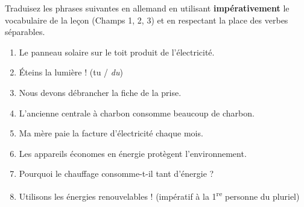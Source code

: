 \documentclass[11pt]{article}
\begin{document}
\begin{exercice}
Traduisez les phrases suivantes en allemand en utilisant \textbf{impérativement} le vocabulaire de la leçon (Champs 1, 2, 3) et en respectant la place des verbes séparables.

\begin{enumerate}
    \item Le panneau solaire sur le toit produit de l'électricité.
    \item Éteins la lumière ! (tu / \emph{du})
    \item Nous devons débrancher la fiche de la prise.
    \item L'ancienne centrale à charbon consomme beaucoup de charbon.
    \item Ma mère paie la facture d'électricité chaque mois.
    \item Les appareils économes en énergie protègent l'environnement.
    \item Pourquoi le chauffage consomme-t-il tant d'énergie ?
    \item Utilisons les énergies renouvelables ! (impératif à la 1\textsuperscript{re} personne du pluriel)
\end{enumerate}
\end{exercice}
\end{document}
